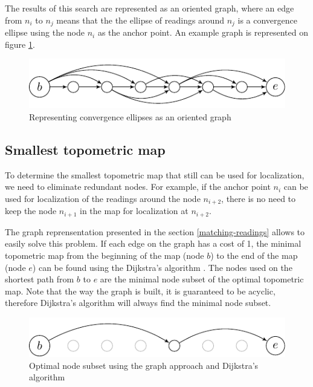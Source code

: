 \documentclass[letterpaper,10 pt,conference]{ieeeconf}
\begin{document}
The results of this search are represented as an oriented graph, where an edge from $n_{i}$ to
$n_{j}$ means that the the ellipse of readings around $n_{j}$ is a convergence ellipse using the
node $n_i$ as the anchor point. An example graph is represented on figure \ref{graph_unoptimized}.

\begin{figure}[thpb]
  \centering
  \includegraphics[scale=1.0]{unoptimized-graph}
  \caption{Representing convergence ellipses as an oriented graph}
  \label{graph_unoptimized}
\end{figure}


\subsection{Smallest topometric map}
To determine the smallest topometric map that still can be used for localization, we need to eliminate redundant nodes.
For example, if the anchor point $n_{i}$ can be used for localization of the readings around the node $n_{i+2}$, there is no need to keep the node $n_{i+1}$
in the map for localization at $n_{i+2}$.


The graph reprensentation presented in the section \ref{matching-readings} allows to easily solve this problem. If each edge
on the graph has a cost of 1, the minimal topometric map from the beginning of the map (node $b$) to the end of the map (node $e$)
can be found using the Dijkstra's algorithm \cite{dijkstra}. The nodes used
on the shortest path from $b$ to $e$ are the minimal node subset of the optimal topometric map. Note that the way the graph is built, it
is guaranteed to be acyclic, therefore Dijkstra's algorithm will always find the minimal node subset.


\begin{figure}[thpb]
  \centering
  \includegraphics[scale=1.0]{optimized-graph}
  \caption{Optimal node subset using the graph approach and Dijkstra's algorithm}
\end{figure}
\end{document}
